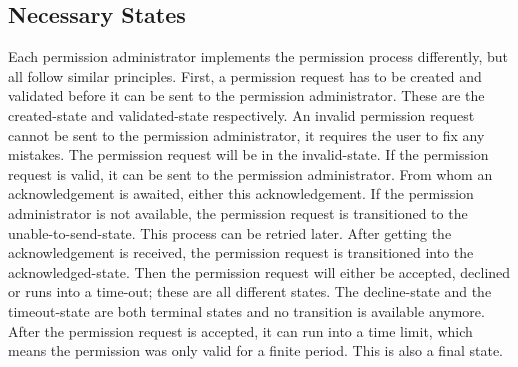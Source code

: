 \subsection{Necessary States}\label{subsec:necessary-states}
Each permission administrator implements the permission process differently, but all follow similar principles.
First, a permission request has to be created and validated before it can be sent to the permission administrator.
These are the created-state and validated-state respectively.
An invalid permission request cannot be sent to the permission administrator, it requires the user to fix any mistakes.
The permission request will be in the invalid-state.
If the permission request is valid, it can be sent to the permission administrator.
From whom an acknowledgement is awaited, either this acknowledgement.
If the permission administrator is not available, the permission request is transitioned to the unable-to-send-state.
This process can be retried later.
After getting the acknowledgement is received, the permission request is transitioned into the acknowledged-state.
Then the permission request will either be accepted, declined or runs into a time-out; these are all different states.
The decline-state and the timeout-state are both terminal states and no transition is available anymore.
After the permission request is accepted, it can run into a time limit,
which means the permission was only valid for a finite period.
This is also a final state.